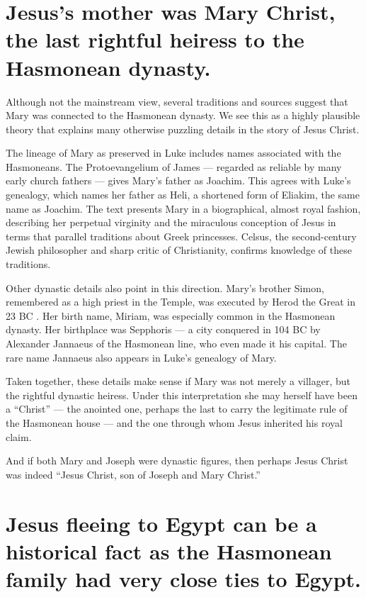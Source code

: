 \section{Jesus's mother was Mary Christ, the last rightful heiress to the Hasmonean dynasty.}\label{sec:jesuss-mother-was-mary-christ-the-last-rightful-heiress-to-the-hasmonean-dynasty.}

Although not the mainstream view, several traditions and sources suggest that Mary was connected to the Hasmonean dynasty.
We see this as a highly plausible theory that explains many otherwise puzzling details in the story of Jesus Christ.

The lineage of Mary as preserved in Luke includes names associated with the Hasmoneans.
The Protoevangelium of James — regarded as reliable by many early church fathers — gives Mary’s father as Joachim.
This agrees with Luke’s genealogy, which names her father as Heli, a shortened form of Eliakim, the same name as Joachim.
The text presents Mary in a biographical, almost royal fashion, describing her perpetual virginity and the miraculous conception of Jesus in terms that parallel traditions about Greek princesses.
Celsus, the second-century Jewish philosopher and sharp critic of Christianity, confirms knowledge of these traditions.

Other dynastic details also point in this direction.
Mary’s brother Simon, remembered as a high priest in the Temple, was executed by Herod the Great in 23 BC .
Her birth name, Miriam, was especially common in the Hasmonean dynasty.
Her birthplace was Sepphoris — a city conquered in 104 BC by Alexander Jannaeus of the Hasmonean line, who even made it his capital.
The rare name Jannaeus also appears in Luke’s genealogy of Mary.

Taken together, these details make sense if Mary was not merely a villager, but the rightful dynastic heiress.
Under this interpretation she may herself have been a “Christ” — the anointed one, perhaps the last to carry the legitimate rule of the Hasmonean house — and the one through whom Jesus inherited his royal claim.

And if both Mary and Joseph were dynastic figures, then perhaps Jesus Christ was indeed “Jesus Christ, son of Joseph and Mary Christ.”

\section{Jesus fleeing to Egypt can be a historical fact as the Hasmonean family had very close ties to Egypt.}\label{sec:jesus-fleeing-to-egypt-can-be-a-historical-fact-as-the-hasmonean-family-had-very-close-ties-to-egypt.}


